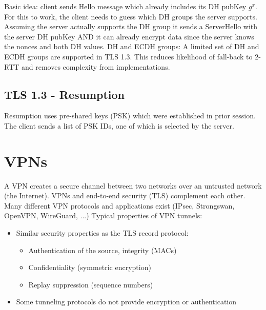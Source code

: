 \documentclass[11pt,oneside,a4paper]{article}
\begin{document}
Basic idea: client sends Hello message which already includes its DH pubKey $g^x$. For this to work, the client needs to guess which DH groups the server supports.
Assuming the server actually supports the DH group it sends a ServerHello with the server DH pubKey AND it can already encrypt data since the server knows the nonces and both DH values.
DH and ECDH groups: A limited set of DH and ECDH groups are supported in TLS 1.3. This reduces likelihood of fall-back to 2-RTT and removes complexity from implementations.

\subsection{TLS 1.3 - Resumption}

Resumption uses pre-shared keys (PSK) which were established in prior session. The client sends a list of PSK IDs, one of which is selected by the server.









\section{VPNs}

A VPN creates a secure channel between two networks over an untrusted network (the Internet). VPNs and end-to-end security (TLS) complement each other. Many different VPN protocols and applications exist (IPsec, Strongswan, OpenVPN, WireGuard, ...)
Typical properties of VPN tunnels:

\vspace{-\topsep}
\begin{itemize}
	\setlength{\itemsep}{0pt}
	\setlength{\parskip}{0pt}
	\item Similar security properties as the TLS record protocol:
	\begin{itemize}
		\item Authentication of the source, integrity (MACs)
		\item Confidentiality (symmetric encryption)
		\item Replay suppression (sequence numbers)
	\end{itemize}
	\item Some tunneling protocols do not provide encryption or authentication
\end{itemize}
\vspace{-\topsep}
\end{document}
